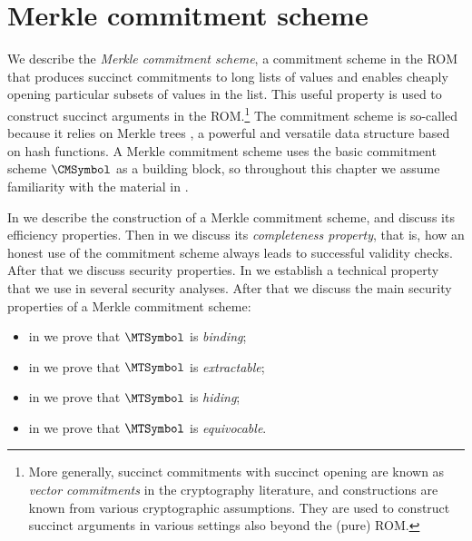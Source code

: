 \chapter{Merkle commitment scheme}
\label{chapter:merkle-commitment}

We describe the \emph{Merkle commitment scheme}, a commitment scheme in the ROM that produces succinct commitments to long lists of values and enables cheaply opening particular subsets of values in the list. This useful  property is used to construct succinct arguments in the ROM.\footnote{More generally, succinct commitments with succinct opening are known as \emph{vector commitments} in the cryptography literature, and constructions are known from various cryptographic assumptions. They are used to construct succinct arguments in various settings also beyond the (pure) ROM.} The commitment scheme is so-called because it relies on Merkle trees \cite{Merkle89-tree}, a powerful and versatile data structure based on hash functions. A Merkle commitment scheme uses the basic commitment scheme $\CMSymbol$ as a building block, so throughout this chapter we assume familiarity with the material in .

In  we describe the construction of a Merkle commitment scheme, and discuss its efficiency properties. Then in  we discuss its \emph{completeness property}, that is, how an honest use of the commitment scheme always leads to successful validity checks. After that we discuss security properties. In  we establish a technical property that we use in several security analyses. After that we discuss the main security properties of a Merkle commitment scheme:
\begin{itemize}[noitemsep]
  \item in  we prove that $\MTSymbol$ is \emph{binding};
  \item in  we prove that $\MTSymbol$ is \emph{extractable};
  \item in  we prove that $\MTSymbol$ is \emph{hiding};
  \item in  we prove that $\MTSymbol$ is \emph{equivocable}.
\end{itemize}


